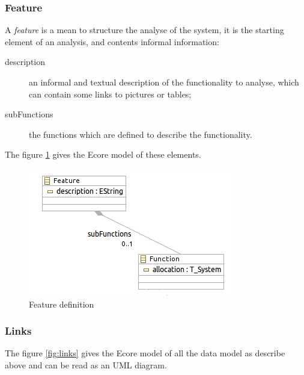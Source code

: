 \subsubsection{Feature}

A \textit{feature} is a mean to structure the analyse of the system, it is the starting element of an analysis, and contents informal information:
\begin{description}
\item[description] an informal and textual description of the functionality to analyse, which can contain some links to pictures or tables;
\item[subFunctions] the functions which are defined to describe the functionality.
\end{description}

The figure \ref{fig:feature} gives the Ecore model of these elements.

\begin{figure}[ht]
  \centering
  \includegraphics{DataModel/Feature1.png}
  \caption{Feature definition}
  \label{fig:feature}
\end{figure}

\subsubsection{Links}


The figure \ref{fig:links} gives the Ecore model of all the data model as describe above and can be read as an UML diagram.

